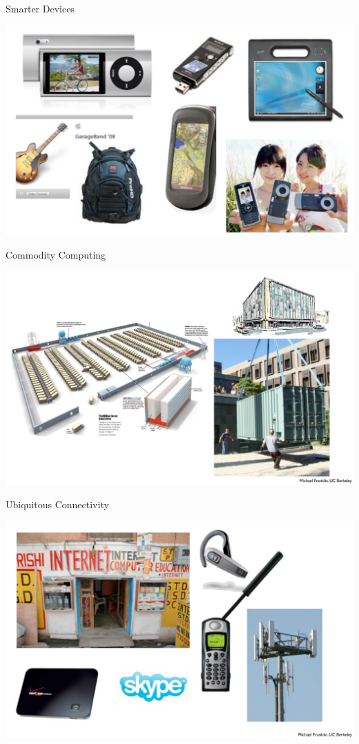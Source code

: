 \documentclass{beamer}
\begin{document}
\begin{frame}{Smarter Devices}
    \begin{center}
        \includegraphics[scale=0.28]{smarterDevices.png}
    \end{center}
\end{frame}
\begin{frame}{Commodity Computing}
    \begin{center}
        \includegraphics[scale=0.28]{commodityComputing.png}
    \end{center}
\end{frame}
\begin{frame}{Ubiquitous Connectivity}
    \begin{center}
        \includegraphics[scale=0.28]{ubiquitousConnectivity.png}
    \end{center}
\end{frame}
\end{document}
